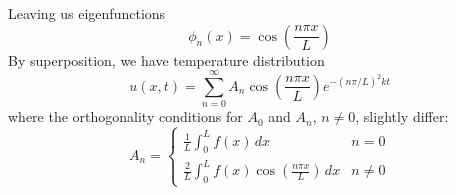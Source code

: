 \documentclass[a4paper]{article}
\begin{document}
\begin{enumerate}[label=(\alph*)]
\[	\]
	Leaving us eigenfunctions
	\[
		\phi_{n}\!\left( x \right) = \cos\!\left(\frac{n \pi x}{L}\right) 
	\]
	By superposition, we have temperature distribution
	\[
		u \!\left( x,t \right) = \sum^{\infty}_{n=0} A_{n}\cos\!\left(\frac{n \pi x}{L}\right)e^{-\!\left( n \pi / L \right)^{2}kt}
	\]
	where the orthogonality conditions for \( A_{0} \) and \( A_{n} \), \( n \neq 0 \), slightly differ:
	\[
		A_{n} = 
		\begin{cases}
			\displaystyle{\frac{1}{L}\int^{L}_{0} f \!\left( x \right) \, dx} & n = 0 \\[12pt]
			\displaystyle{\frac{2}{L}\int^{L}_{0} f \!\left( x \right)\cos\!\left(\frac{n \pi x}{L}\right) \, dx} & n \neq 0
		\end{cases}
	\]
\end{enumerate}

\newpage
\end{document}
